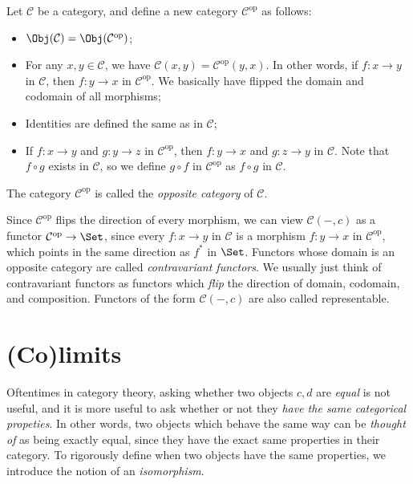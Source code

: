 \documentclass[11pt, A4]{article}
\begin{document}
\begin{construction}\label{3.3}
	Let $\mathcal{C} $ be a category, and define a new category $\mathcal{C} ^{\mathrm{op}} $ as follows:
	\begin{itemize}
		\item $\Obj(\mathcal{C} ) =\Obj(\mathcal{C} ^{\mathrm{op}} ) $;
		\item For any $x,y\in \mathcal{C} $, we have $\mathcal{C} (x,y)=\mathcal{C} ^{\mathrm{op}} (y,x)$. In other words, if $f : x \to y$ in $\mathcal{C} $, then $f : y \to x$ in $\mathcal{C} ^{\mathrm{op}} $. We basically have flipped the domain and codomain of all morphisms;
		\item Identities are defined the same as in $\mathcal{C} $;
		\item If $f : x \to y$ and $g : y \to z$ in $\mathcal{C} ^{\mathrm{op}} $, then $f : y \to x$ and $g : z \to y$ in $\mathcal{C} $. Note that $f\circ g$ exists in $\mathcal{C} $, so we define $g\circ f$ in $\mathcal{C} ^{\mathrm{op}} $ as $f\circ g$ in $\mathcal{C} $.
	\end{itemize}
	The category $\mathcal{C} ^{\mathrm{op}} $ is called the \emph{opposite category} of $\mathcal{C} $.
\end{construction}

Since $\mathcal{C} ^{\mathrm{op}} $ flips the direction of every morphism, we can view $\mathcal{C} (-,c)$ as a functor $\mathcal{C} ^{\mathrm{op}} \to \Set $, since every $f : x \to y$ in $\mathcal{C} $ is a morphism $f : y \to x$ in $\mathcal{C} ^{\mathrm{op}} $, which points in the same direction as $f^*$ in $\Set $. Functors whose domain is an opposite category are called \emph{contravariant functors}. We usually just think of contravariant functors as functors which \emph{flip} the direction of domain, codomain, and composition. Functors of the form $\mathcal{C} (-,c)$ are also called representable.

\section{(Co)limits}

Oftentimes in category theory, asking whether two objects $c,d$ are \emph{equal} is not useful, and it is more useful to ask whether or not they \emph{have the same categorical propeties}. In other words, two objects which behave the same way can be \emph{thought of} as being exactly equal, since they have the exact same properties in their category. To rigorously define when two objects have the same properties, we introduce the notion of an \emph{isomorphism}.
\end{document}
